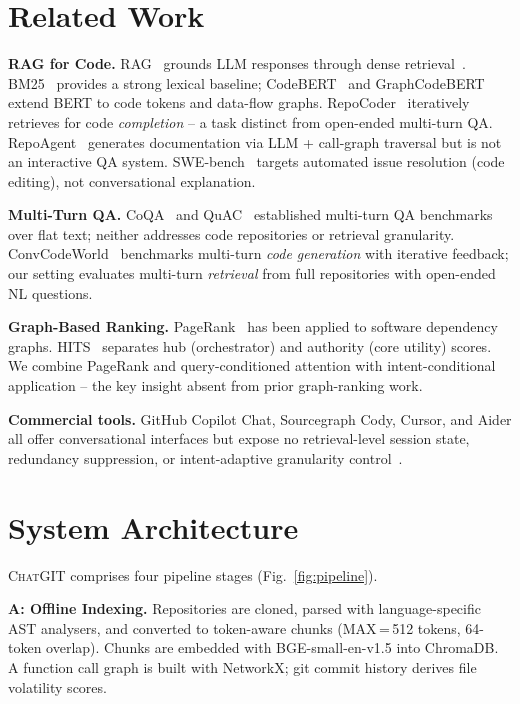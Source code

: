 \documentclass[conference]{IEEEtran}
\newcommand{\chatgit}{\textsc{ChatGIT}\xspace}
\begin{document}
\section{Related Work}

\textbf{RAG for Code.} RAG~\cite{lewis2021rag} grounds LLM responses
through dense retrieval~\cite{guo2024lightrag}. BM25~\cite{robertson2009bm25}
provides a strong lexical baseline; CodeBERT~\cite{feng2020codebert}
and GraphCodeBERT~\cite{guo2021graphcodebert} extend BERT to code tokens
and data-flow graphs. RepoCoder~\cite{zhang2023repocoder} iteratively
retrieves for code \emph{completion} -- a task distinct from open-ended
multi-turn QA. RepoAgent~\cite{liu2024repoagent} generates documentation
via LLM + call-graph traversal but is not an interactive QA system.
SWE-bench~\cite{jimenez2024swebench} targets automated issue resolution
(code editing), not conversational explanation.

\textbf{Multi-Turn QA.} CoQA~\cite{reddy2019coqa} and
QuAC~\cite{choi2018quac} established multi-turn QA benchmarks over flat
text; neither addresses code repositories or retrieval granularity.
ConvCodeWorld~\cite{han2025convcodeworld} benchmarks multi-turn
\emph{code generation} with iterative feedback; our setting
evaluates multi-turn \emph{retrieval} from full repositories with
open-ended NL questions.

\textbf{Graph-Based Ranking.} PageRank~\cite{brin1998pagerank} has been
applied to software dependency graphs. HITS~\cite{kleinberg1999hits}
separates hub (orchestrator) and authority (core utility) scores.
We combine PageRank and query-conditioned attention with intent-conditional
application -- the key insight absent from prior graph-ranking work.

\textbf{Commercial tools.} GitHub Copilot Chat, Sourcegraph Cody, Cursor,
and Aider all offer conversational interfaces but expose no
retrieval-level session state, redundancy suppression, or intent-adaptive
granularity control~\cite{githubcopilot,cody,cursor,aider}.

\section{System Architecture}

\chatgit comprises four pipeline stages (Fig.~\ref{fig:pipeline}).

\textbf{A: Offline Indexing.} Repositories are cloned, parsed with
language-specific AST analysers, and converted to token-aware chunks
(MAX\,=\,512 tokens, 64-token overlap). Chunks are embedded with
BGE-small-en-v1.5 into ChromaDB. A function call graph is built with
NetworkX; git commit history derives file volatility scores.
\end{document}

